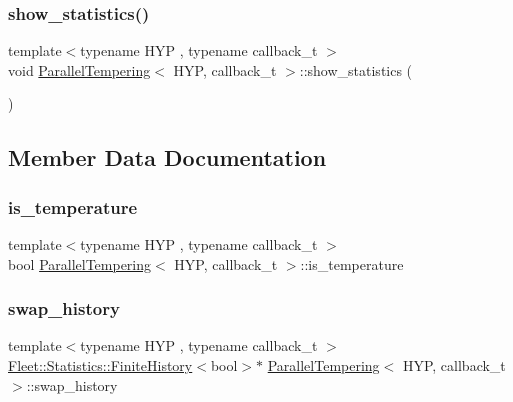 \mbox{\label{class_parallel_tempering_a9e1960158b12a4dadfab54eb4fb895d3}} 
\subsubsection{\texorpdfstring{show\+\_\+statistics()}{show\_statistics()}}
{\footnotesize\ttfamily template$<$typename H\+YP , typename callback\+\_\+t $>$ \\
void \hyperlink{class_parallel_tempering}{Parallel\+Tempering}$<$ H\+YP, callback\+\_\+t $>$\+::show\+\_\+statistics (\begin{DoxyParamCaption}{ }\end{DoxyParamCaption})\hspace{0.3cm}{\ttfamily [inline]}}



\subsection{Member Data Documentation}
\mbox{\label{class_parallel_tempering_ae9f0a2af938df838cc4010983860394e}} 
\subsubsection{\texorpdfstring{is\+\_\+temperature}{is\_temperature}}
{\footnotesize\ttfamily template$<$typename H\+YP , typename callback\+\_\+t $>$ \\
bool \hyperlink{class_parallel_tempering}{Parallel\+Tempering}$<$ H\+YP, callback\+\_\+t $>$\+::is\+\_\+temperature}

\mbox{\label{class_parallel_tempering_a86a7b77250a04b5df502f1c770cf51bf}} 
\subsubsection{\texorpdfstring{swap\+\_\+history}{swap\_history}}
{\footnotesize\ttfamily template$<$typename H\+YP , typename callback\+\_\+t $>$ \\
\hyperlink{class_fleet_1_1_statistics_1_1_finite_history}{Fleet\+::\+Statistics\+::\+Finite\+History}$<$bool$>$$\ast$ \hyperlink{class_parallel_tempering}{Parallel\+Tempering}$<$ H\+YP, callback\+\_\+t $>$\+::swap\+\_\+history}

